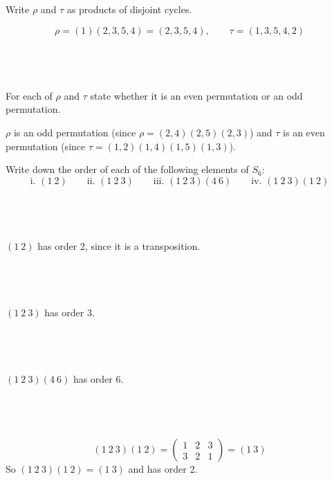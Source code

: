 \documentclass[a4paper]{article}
\begin{document}
\begin{questionbody}
Write $\rho$ and $\tau$ as products of disjoint cycles.
\end{questionbody}

$$\rho = (1) (2, 3, 5, 4) = (2, 3, 5, 4), \qquad \tau = (1, 3, 5, 4, 2)$$

\newpage
\subsection{~} %

\begin{questionbody}
For each of $\rho$ and $\tau$ state whether it is an even permutation or an odd permutation.
\end{questionbody}

$\rho$ is an odd permutation (since $\rho = (2, 4) (2, 5) (2, 3)$) and $\tau$ is an even permutation (since $\tau = (1, 2) (1, 4) (1, 5) (1, 3)$).


\begin{questionbody}
Write down the order of each of the following elements of $S_6$: \[
\text{i. } (1\ 2)
\qquad \text{ii. } (1\ 2\ 3)
\qquad \text{iii. } (1\ 2\ 3) (4\ 6)
\qquad \text{iv. } (1\ 2\ 3) (1\ 2)
\]
\end{questionbody}

\subsection{~} %

$(1\ 2)$ has order 2, since it is a transposition.

\subsection{~} %

$(1\ 2\ 3)$ has order 3.

\subsection{~} %

$(1\ 2\ 3)(4\ 6)$ has order 6.

\subsection{~} %

$$(1\ 2\ 3)(1\ 2) = \begin{pmatrix}1 & 2 & 3\\ 3 & 2 & 1\end{pmatrix} = (1\ 3)$$
So $(1\ 2\ 3)(1\ 2) = (1\ 3)$ and has order 2.
\end{document}
